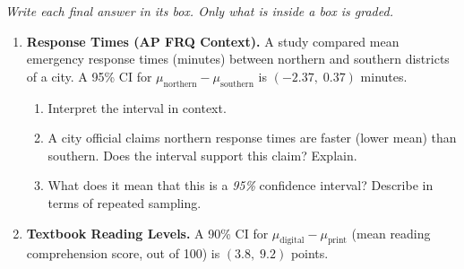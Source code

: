 \documentclass[10pt]{article}
\begin{document}
{\small\itshape Write each final answer in its box. Only what is inside a box is graded.}\par

\vspace{0.15in}

\begin{enumerate}

\item \textbf{Response Times (AP FRQ Context).} \quad
A study compared mean emergency response times (minutes) between northern and southern
districts of a city. A 95\% CI for $\mu_{\text{northern}} - \mu_{\text{southern}}$ is
$(-2.37,\; 0.37)$ minutes.

\begin{enumerate}[label=\alph*.]
  \boxguard
  \item Interpret the interval in context. 
  \boxguard
  \item A city official claims northern response times are faster (lower mean) than
        southern. Does the interval support this claim? Explain. 
  \boxguard
  \item What does it mean that this is a \emph{95\%} confidence interval? Describe in
        terms of repeated sampling. \gradedhide{\writeline}\gradedbelow[l]{1.5pt}{\kern-3pt\gradedblank[id=hw1c, type=rubric, points=2, display={\bfseries\boldmath About 95\% of intervals from repeated samples capture $\mu_N - \mu_S$.}]{\linewidth+6pt}{0.17in}}\par\vspace{2.05in}
\end{enumerate}

\vspace{0.06in}

\newpage
\item \textbf{Textbook Reading Levels.} \quad
A 90\% CI for $\mu_{\text{digital}} - \mu_{\text{print}}$ (mean reading comprehension score,
out of 100) is $(3.8,\; 9.2)$ points.


\end{enumerate}
\end{document}
